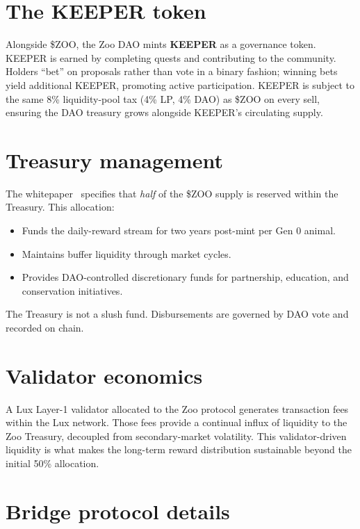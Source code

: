 \documentclass[11pt,letterpaper]{article}
\begin{document}
\section{The KEEPER token}

Alongside \$ZOO, the Zoo DAO mints \textbf{KEEPER} as a governance token. KEEPER is earned by completing quests and contributing to the community. Holders ``bet'' on proposals rather than vote in a binary fashion; winning bets yield additional KEEPER, promoting active participation. KEEPER is subject to the same 8\% liquidity-pool tax (4\% LP, 4\% DAO) as \$ZOO on every sell, ensuring the DAO treasury grows alongside KEEPER's circulating supply.

\section{Treasury management}

The whitepaper~\cite{zoo2021} specifies that \emph{half} of the \$ZOO supply is reserved within the Treasury. This allocation:

\begin{itemize}
  \item Funds the daily-reward stream for two years post-mint per Gen 0 animal.
  \item Maintains buffer liquidity through market cycles.
  \item Provides DAO-controlled discretionary funds for partnership, education, and conservation initiatives.
\end{itemize}

The Treasury is not a slush fund. Disbursements are governed by DAO vote and recorded on chain.

\section{Validator economics}

A Lux Layer-1 validator allocated to the Zoo protocol generates transaction fees within the Lux network. Those fees provide a continual influx of liquidity to the Zoo Treasury, decoupled from secondary-market volatility. This validator-driven liquidity is what makes the long-term reward distribution sustainable beyond the initial 50\% allocation.

\section{Bridge protocol details}
\end{document}
